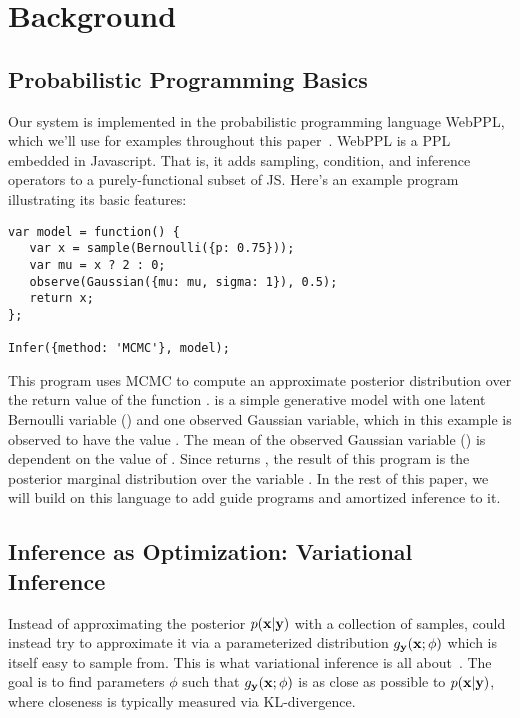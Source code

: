 \section{Background}
\label{sec:background}

\subsection{Probabilistic Programming Basics}
\label{sec:pplbasics}

Our system is implemented in the probabilistic programming language WebPPL, which we'll use for examples throughout this paper~\cite{WebPPL}.
WebPPL is a PPL embedded in Javascript.
That is, it adds sampling, condition, and inference operators to a purely-functional subset of JS.
Here's an example program illustrating its basic features:
\begin{lstlisting}
var model = function() {
   var x = sample(Bernoulli({p: 0.75}));
   var mu = x ? 2 : 0;
   observe(Gaussian({mu: mu, sigma: 1}), 0.5);
   return x;
};

Infer({method: 'MCMC'}, model);
\end{lstlisting}
This program uses MCMC to compute an approximate posterior distribution over the return value of the function .  is a simple generative model with one latent Bernoulli variable () and one observed Gaussian variable, which in this example is observed to have the value . The mean of the observed Gaussian variable () is dependent on the value of . Since  returns , the result of this program is the posterior marginal distribution over the variable .
In the rest of this paper, we will build on this language to add guide programs and amortized inference to it.

\subsection{Inference as Optimization: Variational Inference}
\label{sec:background:variational}

Instead of approximating the posterior $p(\mathbf{x} | \mathbf{y})$ with a collection of samples, could instead try to approximate it via a parameterized distribution $g_{\mathbf{y}}(\mathbf{x} ; \phi)$ which is itself easy to sample from.
This is what variational inference is all about~\cite{VariationalInference}.
The goal is to find parameters $\phi$ such that $g_{\mathbf{y}}(\mathbf{x} ; \phi)$ is as close as possible to $p(\mathbf{x} | \mathbf{y})$, where closeness is typically measured via KL-divergence.

